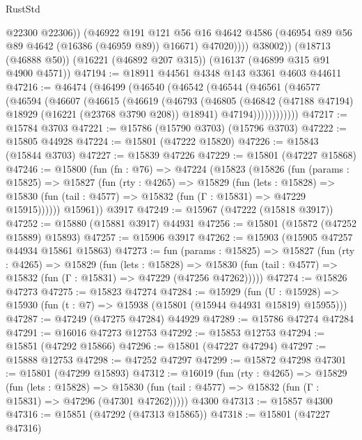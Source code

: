 \begin{lexlean}{RustStd}
\begin{coremodule}
                  @22300
                  @22306))
              (@46922
                @191
                @121
                @56
                @16
                @4642
                @4586
                (@46954 @89 @56 @89 @4642 (@16386 (@46959 @89)) @16671)
                @47020))))
        @38002))
    (@18713 (@46888 @50))
    (@16221 (@46892 @207 @315))
    (@16137 (@46899 @315 @91 @4900 @4571))
@47194 := @18911 @44561 @4348 @143 @3361 @4603 @44611
@47216 := @46474
    (@46499
      (@46540
        (@46542
          (@46544
            (@46561
              (@46577
                (@46594
                  (@46607
                    (@46615
                      (@46619
                        (@46793
                          (@46805
                            (@46842 (@47188 @47194) @18929 (@16221 (@23768 @3790 @208)) @18941)
                            @47194))))))))))))
@47217 := @15784 @3703
@47221 := @15786 (@15790 @3703) (@15796 @3703)
@47222 := @15805 @44928
@47224 := @15801 (@47222 @15820)
@47226 := @15843 (@15844 @3703)
@47227 := @15839 @47226
@47229 := @15801 (@47227 @15868)
@47246 := @15800
    (fun (fn : @76) =>
    @47224
      (@15823
        (@15826
          (fun (params : @15825) =>
          @15827
            (fun (rty : @4265) =>
            @15829
              (fun (lets : @15828) =>
              @15830 (fun (tail : @4577) => @15832 (fun (Γ : @15831) => @47229 @15915))))))
        @15961))
    @3917
@47249 := @15967 (@47222 (@15818 @3917))
@47252 := @15880 (@15881 @3917) @44931
@47256 := @15801 (@15872 (@47252 @15889) @15893)
@47257 := @15906 @3917
@47262 := @15903 (@15905 @47257 @44934 @15861 @15863)
@47273 := fun (params : @15825) =>
  @15827
    (fun (rty : @4265) =>
    @15829
      (fun (lets : @15828) =>
      @15830 (fun (tail : @4577) => @15832 (fun (Γ : @15831) => @47229 (@47256 @47262)))))
@47274 := @15826 @47273
@47275 := @15823 @47274
@47284 := @15929
    (fun (U : @15928) => @15930 (fun (t : @7) => @15938 (@15801 (@15944 @44931 @15819) @15955)))
@47287 := @47249 (@47275 @47284) @44929
@47289 := @15786 @47274 @47284
@47291 := @16016 @47273 @12753
@47292 := @15853 @12753
@47294 := @15851 (@47292 @15866)
@47296 := @15801 (@47227 @47294)
@47297 := @15888 @12753
@47298 := @47252 @47297
@47299 := @15872 @47298
@47301 := @15801 (@47299 @15893)
@47312 := @16019
    (fun (rty : @4265) =>
    @15829
      (fun (lets : @15828) =>
      @15830 (fun (tail : @4577) => @15832 (fun (Γ : @15831) => @47296 (@47301 @47262)))))
    @4300
@47313 := @15857 @4300
@47316 := @15851 (@47292 (@47313 @15865))
@47318 := @15801 (@47227 @47316)

\end{coremodule}
\end{lexlean}
